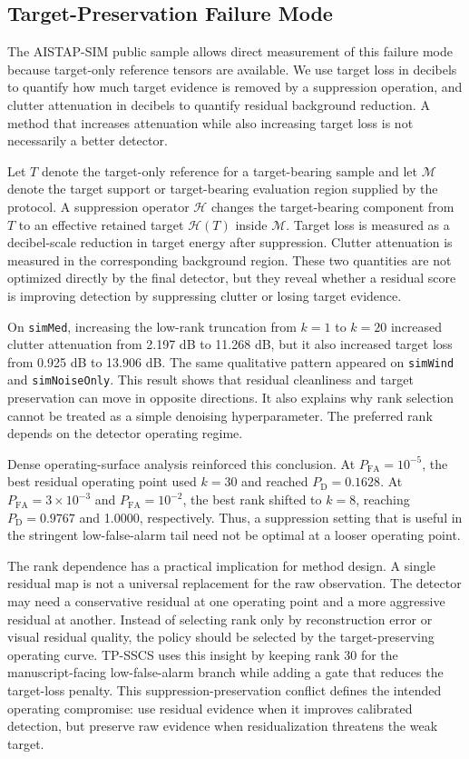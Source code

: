 \documentclass[journal]{IEEEtran}
\begin{document}
\subsection{Target-Preservation Failure Mode}

The AISTAP-SIM public sample allows direct measurement of this failure mode because target-only reference tensors are available. We use target loss in decibels to quantify how much target evidence is removed by a suppression operation, and clutter attenuation in decibels to quantify residual background reduction. A method that increases attenuation while also increasing target loss is not necessarily a better detector.

Let $T$ denote the target-only reference for a target-bearing sample and let $\mathcal{M}$ denote the target support or target-bearing evaluation region supplied by the protocol. A suppression operator $\mathcal{H}$ changes the target-bearing component from $T$ to an effective retained target $\mathcal{H}(T)$ inside $\mathcal{M}$. Target loss is measured as a decibel-scale reduction in target energy after suppression. Clutter attenuation is measured in the corresponding background region. These two quantities are not optimized directly by the final detector, but they reveal whether a residual score is improving detection by suppressing clutter or losing target evidence.

On \texttt{simMed}, increasing the low-rank truncation from $k=1$ to $k=20$ increased clutter attenuation from 2.197 dB to 11.268 dB, but it also increased target loss from 0.925 dB to 13.906 dB. The same qualitative pattern appeared on \texttt{simWind} and \texttt{simNoiseOnly}. This result shows that residual cleanliness and target preservation can move in opposite directions. It also explains why rank selection cannot be treated as a simple denoising hyperparameter. The preferred rank depends on the detector operating regime.

Dense operating-surface analysis reinforced this conclusion. At $P_{\mathrm{FA}}=10^{-5}$, the best residual operating point used $k=30$ and reached $P_{\mathrm{D}}=0.1628$. At $P_{\mathrm{FA}}=3 \times 10^{-3}$ and $P_{\mathrm{FA}}=10^{-2}$, the best rank shifted to $k=8$, reaching $P_{\mathrm{D}}=0.9767$ and 1.0000, respectively. Thus, a suppression setting that is useful in the stringent low-false-alarm tail need not be optimal at a looser operating point.

The rank dependence has a practical implication for method design. A single residual map is not a universal replacement for the raw observation. The detector may need a conservative residual at one operating point and a more aggressive residual at another. Instead of selecting rank only by reconstruction error or visual residual quality, the policy should be selected by the target-preserving operating curve. TP-SSCS uses this insight by keeping rank 30 for the manuscript-facing low-false-alarm branch while adding a gate that reduces the target-loss penalty. This suppression-preservation conflict defines the intended operating compromise: use residual evidence when it improves calibrated detection, but preserve raw evidence when residualization threatens the weak target.
\end{document}
